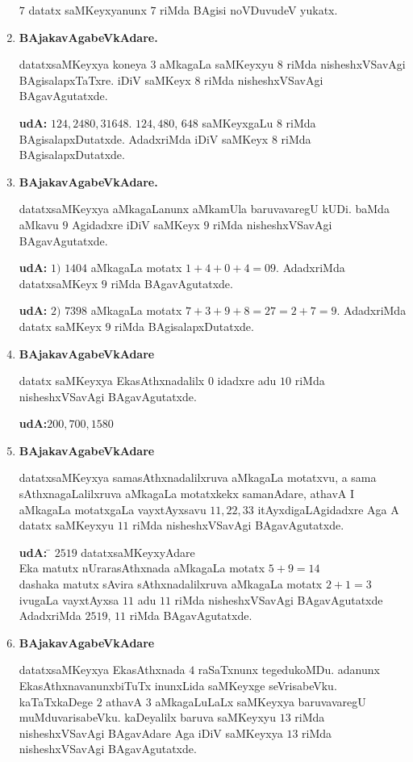 \begin{enumerate}[{\rm 1)}]
$7$ datatx saMKeyxyanunx $7$ riMda BAgisi noVDuvudeV yukatx.
\item {} \textbf{BAjakavAgabeVkAdare.}

datatxsaMKeyxya koneya $3$ aMkagaLa saMKeyxyu $8$ riMda nisheshxVSavAgi BAgisalapxTaTxre. iDiV saMKeyx $8$ riMda nisheshxVSavAgi BAgavAgutatxde.

\textbf{udA:} $124,2480,31648.$  $124,480$, $648$ saMKeyxgaLu $8$ riMda BAgisalapxDutatxde. AdadxriMda iDiV saMKeyx $8$ riMda BAgisalapxDutatxde.

\vfill\eject
\item {} \textbf{BAjakavAgabeVkAdare.}

datatxsaMKeyxya aMkagaLanunx aMkamUla baruvavaregU kUDi. baMda aMkavu $9$ Agidadxre iDiV saMKeyx $9$ riMda nisheshxVSavAgi BAgavAgutatxde.

\textbf{udA:} $1)$ $1404$ aMkagaLa motatx $1+4+0+4 = 09.$ AdadxriMda datatxsaMKeyx $9$ riMda BAgavAgutatxde.

\textbf{udA:} $2)$ $7398$ aMkagaLa motatx $7+3+9+8=27=2+7=9.$ AdadxriMda datatx saMKeyx $9$ riMda BAgisalapxDutatxde.
\item{} \textbf{BAjakavAgabeVkAdare}

datatx saMKeyxya EkasAthxnadalilx $0$ idadxre adu $10$ riMda nisheshxVSavAgi BAgavAgutatxde.

\textbf{udA:}\quad $200,700,1580$
\item  {} \textbf{BAjakavAgabeVkAdare}

datatxsaMKeyxya samasAthxnadalilxruva aMkagaLa motatxvu, a sama sAthxnagaLalilxruva aMkagaLa motatxkekx samanAdare, athavA I aMkagaLa motatxgaLa vayxtAyxsavu $11,22,33$ itAyxdigaLAgidadxre Aga A datatx saMKeyxyu $11$ riMda nisheshxVSavAgi BAga\-vAgutatxde.
\begin{tabbing}
\textbf{udA:} \;\; \= $2519$ datatxsaMKeyxyAdare\\
\> Eka matutx nUrarasAthxnada aMkagaLa motatx $5+9=14$\\
\> dashaka matutx sAvira sAthxnadalilxruva aMkagaLa motatx $2+1=3$\\
\> ivugaLa vayxtAyxsa $11$ adu $11$ riMda nisheshxVSavAgi BAgavAgutatxde\\
\> AdadxriMda $2519$, $11$ riMda BAgavAgutatxde.
\end{tabbing}
\item {} \textbf {BAjakavAgabeVkAdare}

datatxsaMKeyxya EkasAthxnada $4$ raSaTxnunx tegedukoMDu. adanunx EkasAthxnavanunx\-biTuTx inunxLida saMKeyxge seVrisabeVku. kaTaTxkaDege $2$ athavA $3$ aMkagaLuLaLx saMKeyxya baru\-vavaregU muMduvarisabeVku. kaDeyalilx baruva saMKeyxyu $13$ riMda nisheshxVSavAgi BAgavAdare Aga iDiV saMKeyxya $13$ riMda nisheshxVSavAgi BAgavAgutatxde.


\end{enumerate}
